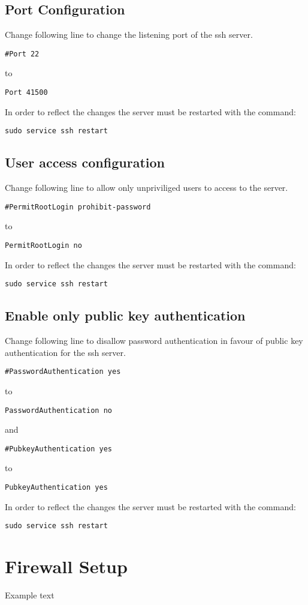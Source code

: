\documentclass[10pt,a4paper]{article}
\begin{document}
\subsection{Port Configuration}
Change following line to change the listening port of the ssh server.

\begin{verbatim}
#Port 22
\end{verbatim}
to
\begin{verbatim}
Port 41500
\end{verbatim}

In order to reflect the changes the server must be restarted with the command:
\begin{verbatim}
sudo service ssh restart
\end{verbatim}

\subsection{User access configuration}
Change following line to allow only unpriviliged users to access to the server.

\begin{verbatim}
#PermitRootLogin prohibit-password
\end{verbatim}
to
\begin{verbatim}
PermitRootLogin no
\end{verbatim}

In order to reflect the changes the server must be restarted with the command:
\begin{verbatim}
sudo service ssh restart
\end{verbatim}

\subsection{Enable only public key authentication}
Change following line to disallow password authentication in favour of public key authentication for the ssh server.

\begin{verbatim}
#PasswordAuthentication yes
\end{verbatim}
to
\begin{verbatim}
PasswordAuthentication no
\end{verbatim}
and
\begin{verbatim}
#PubkeyAuthentication yes
\end{verbatim}
to
\begin{verbatim}
PubkeyAuthentication yes
\end{verbatim}

In order to reflect the changes the server must be restarted with the command:
\begin{verbatim}
sudo service ssh restart
\end{verbatim}

\newpage
\section{Firewall Setup}
Example text
\end{document}
